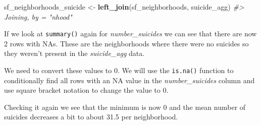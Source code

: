 \documentclass[
  12pt,
]{book}
\newenvironment{Shaded}{\begin{snugshade}}{\end{snugshade}}
\newcommand{\CommentTok}[1]{\textcolor[rgb]{0.37,0.37,0.37}{\textit{#1}}}
\newcommand{\DecValTok}[1]{\textcolor[rgb]{0.06,0.06,0.06}{#1}}
\newcommand{\KeywordTok}[1]{\textcolor[rgb]{0.27,0.27,0.27}{\textbf{#1}}}
\newcommand{\NormalTok}[1]{#1}
\newcommand{\OperatorTok}[1]{\textcolor[rgb]{0.43,0.43,0.43}{\textbf{#1}}}
\newcommand{\StringTok}[1]{\textcolor[rgb]{0.5,0.5,0.5}{#1}}
\begin{document}
\begin{Shaded}
\begin{Highlighting}[]
\NormalTok{sf\_neighborhoods\_suicide \textless{}{-}}\StringTok{ }\KeywordTok{left\_join}\NormalTok{(sf\_neighborhoods, suicide\_agg)}
\CommentTok{\#\textgreater{} Joining, by = "nhood"}
\end{Highlighting}
\end{Shaded}

If we look at \texttt{summary()} again for \emph{number\_suicides} we can see that there are now 2 rows with NAs. These are the neighborhoods where there were no suicides so they weren't present in the \emph{suicide\_agg} data.

\begin{Shaded}
\end{Shaded}

We need to convert these values to 0. We will use the \texttt{is.na()} function to conditionally find all rows with an NA value in the \emph{number\_suicides} column and use square bracket notation to change the value to 0.

\begin{Shaded}
\end{Shaded}

Checking it again we see that the minimum is now 0 and the mean number of suicides decreases a bit to about 31.5 per neighborhood.

\begin{Shaded}
\end{Shaded}
\end{document}
